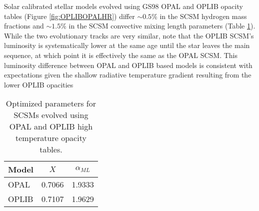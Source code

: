 Solar calibrated stellar models evolved using GS98 OPAL and OPLIB opacity
tables (Figure \ref{fig:OPLIBOPALHR}) differ $\sim 0.5\%$ in the SCSM hydrogen
mass fractions and $\sim 1.5\%$ in the SCSM convective mixing length parameters
(Table \ref{tab:SCSMResults}). While the two evolutionary tracks are very
similar, note that the OPLIB SCSM's luminosity is systematically lower at the
same age until the star leaves the main sequence, at which point it is
effectively the same as the OPAL SCSM. This luminosity difference between OPAL
and OPLIB based models is consistent with expectations given the shallow
radiative temperature gradient resulting from the lower OPLIB opacities

\begin{table}
	\centering
	\begin{tabular}{l c c}
		\hline
		Model & $X$ & $\alpha_{ML}$ \\
		\hline
		\hline
		OPAL & 0.7066 & 1.9333 \\
		OPLIB & 0.7107 & 1.9629
	\end{tabular}
	\caption{Optimized parameters for SCSMs evolved using OPAL and OPLIB high
	temperature opacity tables.}
	\label{tab:SCSMResults}
\end{table}
